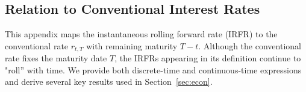 \documentclass[12pt]{article}
\theoremstyle{statementstyle}
\begin{document}
\begin{appendices}
%

\section{Relation to Conventional Interest Rates}
\label{appendix:C}

This appendix maps the instantaneous rolling forward rate (IRFR)
to the conventional rate $r_{t,T}$ with remaining maturity $T-t$.
Although the conventional rate fixes the maturity date $T$,
the IRFRs appearing in its definition continue to "roll'' with time.
We provide both discrete-time and continuous-time expressions and 
derive several key results used in Section~\ref{sec:econ}.


\end{appendices}
\end{document}
